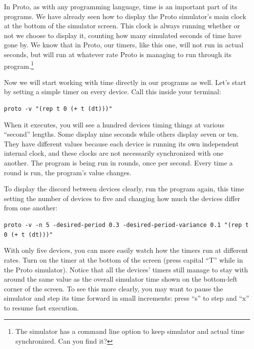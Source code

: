 \documentclass{article}
\newcommand\code[1]{\begin{center}\var{#1}\end{center}}
\newcommand\var[1]{{\tt #1}}
\begin{document}
In Proto, as with any programming language, time is an important part
of its programs.  We have already seen how to display the Proto
simulator's main clock at the bottom of the simulator screen.  This
clock is always running whether or not we choose to display it,
counting how many simulated seconds of time have gone by.  We know
that in Proto, our timers, like this one, will not run in actual
seconds, but will run at whatever rate Proto is managing to run
through its program.\footnote{The simulator has a command line option
  to keep simulator and actual time synchronized.  Can you find it?}

Now we will start working with time directly in our programs as well.
Let's start by setting a simple timer on every device.  Call this
inside your terminal:

\code{proto -v "(rep t 0 (+ t (dt)))"}

When it executes, you will see a hundred devices timing things at
various ``second'' lengths.  Some display nine seconds while others
display seven or ten.  They have different values because each device
is running its own independent internal clock, and these clocks are
not necessarily synchronized with one another.  The program is being
run in rounds, once per second.  Every time a round is run, the
program's value changes.

To display the discord between devices clearly, run the program again,
this time setting the number of devices to five and changing how much
the devices differ from one another:

\code{proto -v -n 5 -desired-period 0.3 -desired-period-variance 0.1 "(rep t 0 (+ t (dt)))"}

With only five devices, you can more easily watch how the timers run
at different rates.  Turn on the timer at the bottom of the screen
(press capital ``T'' while in the Proto simulator).  Notice that all
the devices' timers still manage to stay with around the same value as
the overall simulator time shown on the bottom-left corner of the
screen.  To see this more clearly, you may want to pause the simulator
and step its time forward in small increments: press ``s'' to step and
``x'' to resume fast execution.
\end{document}
